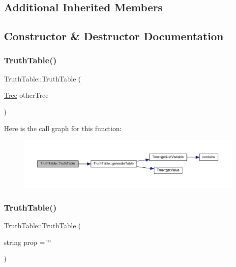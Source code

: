 \subsection*{Additional Inherited Members}


\subsection{Constructor \& Destructor Documentation}
\mbox{\label{class_truth_table_a1d7d8e978c1ab80e94f5433efc914f49}} 
\subsubsection{\texorpdfstring{Truth\+Table()}{TruthTable()}\hspace{0.1cm}{\footnotesize\ttfamily [1/3]}}
{\footnotesize\ttfamily Truth\+Table\+::\+Truth\+Table (\begin{DoxyParamCaption}\item[{\hyperlink{class_tree}{Tree}}]{other\+Tree }\end{DoxyParamCaption})\hspace{0.3cm}{\ttfamily [explicit]}}

Here is the call graph for this function\+:\nopagebreak
\begin{figure}[H]
\begin{center}
\leavevmode
\includegraphics[width=350pt]{dc/d49/class_truth_table_a1d7d8e978c1ab80e94f5433efc914f49_cgraph}
\end{center}
\end{figure}
\mbox{\label{class_truth_table_abab023791b3a72496ff56434fc0e02b4}} 
\subsubsection{\texorpdfstring{Truth\+Table()}{TruthTable()}\hspace{0.1cm}{\footnotesize\ttfamily [2/3]}}
{\footnotesize\ttfamily Truth\+Table\+::\+Truth\+Table (\begin{DoxyParamCaption}\item[{string}]{prop = {\ttfamily \char`\"{}\char`\"{}} }\end{DoxyParamCaption})\hspace{0.3cm}{\ttfamily [explicit]}}

